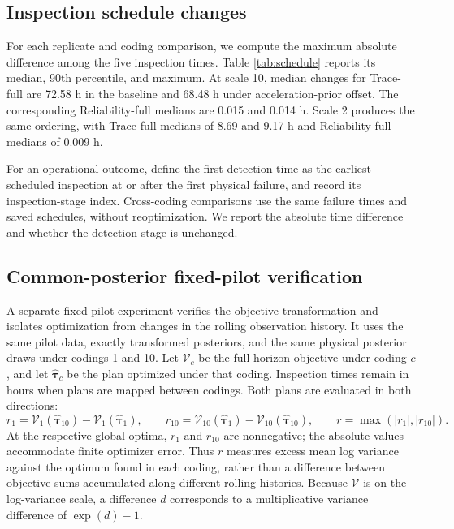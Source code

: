 \documentclass[a4paper,fleqn]{cas-sc}
\begin{document}
\subsection{Inspection schedule changes}

For each replicate and coding comparison, we compute the maximum absolute difference among the five inspection times. Table \ref{tab:schedule} reports its median, 90th percentile, and maximum. At scale 10, median changes for Trace-full are 72.58 h in the baseline and 68.48 h under acceleration-prior offset. The corresponding Reliability-full medians are 0.015 and 0.014 h. Scale 2 produces the same ordering, with Trace-full medians of 8.69 and 9.17 h and Reliability-full medians of 0.009 h.

\begin{table}[t]
\centering
\caption{Maximum inspection-time differences across equivalent codings, in hours.}
\label{tab:schedule}
\resizebox{\textwidth}{!}{}
\end{table}

For an operational outcome, define the first-detection time as the earliest scheduled inspection at or after the first physical failure, and record its inspection-stage index. Cross-coding comparisons use the same failure times and saved schedules, without reoptimization. We report the absolute time difference and whether the detection stage is unchanged.

\subsection{Common-posterior fixed-pilot verification}
\label{sec:commonposterior}

A separate fixed-pilot experiment verifies the objective transformation and isolates optimization from changes in the rolling observation history. It uses the same pilot data, exactly transformed posteriors, and the same physical posterior draws under codings 1 and 10. Let $\mathcal V_c$ be the full-horizon objective under coding $c$, and let $\hat{\boldsymbol\tau}_c$ be the plan optimized under that coding. Inspection times remain in hours when plans are mapped between codings. Both plans are evaluated in both directions:
\begin{equation}
r_1=\mathcal V_1(\hat{\boldsymbol\tau}_{10})-\mathcal V_1(\hat{\boldsymbol\tau}_1),\qquad
r_{10}=\mathcal V_{10}(\hat{\boldsymbol\tau}_1)-\mathcal V_{10}(\hat{\boldsymbol\tau}_{10}),\qquad
r=\max(|r_1|,|r_{10}|).
\end{equation}
At the respective global optima, $r_1$ and $r_{10}$ are nonnegative; the absolute values accommodate finite optimizer error. Thus $r$ measures excess mean log variance against the optimum found in each coding, rather than a difference between objective sums accumulated along different rolling histories. Because $\mathcal V$ is on the log-variance scale, a difference $d$ corresponds to a multiplicative variance difference of $\exp(d)-1$.
\end{document}
